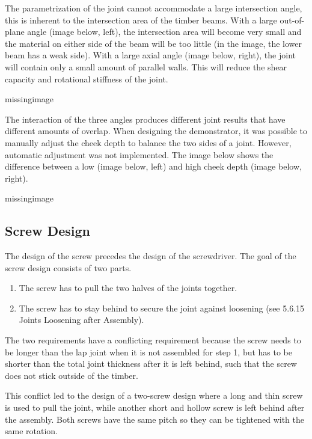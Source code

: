 The parametrization of the joint cannot accommodate a large intersection angle, this is inherent to the intersection area of the timber beams. With a large out-of-plane angle (image below, left), the intersection area will become very small and the material on either side of the beam will be too little (in the image, the lower beam has a weak side). With a large axial angle (image below, right), the joint will contain only a small amount of parallel walls. This will reduce the shear capacity and rotational stiffness of the joint.

missingimage

The interaction of the three angles produces different joint results that have different amounts of overlap. When designing the demonstrator, it was possible to manually adjust the cheek depth to balance the two sides of a joint. However, automatic adjustment was not implemented. The image below shows the difference between a low (image below, left) and high cheek depth (image below, right).

missingimage

\subsection{Screw Design}
\label{subsection:exploration_4_screw_design}

The design of the screw precedes the design of the screwdriver. The goal of the screw design consists of two parts. 

\begin{enumerate}
    \item The screw has to pull the two halves of the joints together.
    \item The screw has to stay behind to secure the joint against loosening (see 5.6.15 Joints Loosening after Assembly).

\end{enumerate}
The two requirements have a conflicting requirement because the screw needs to be longer than the lap joint when it is not assembled for step 1, but has to be shorter than the total joint thickness after it is left behind, such that the screw does not stick outside of the timber. 

This conflict led to the design of a two-screw design where a long and thin screw is used to pull the joint, while another short and hollow screw is left behind after the assembly. Both screws have the same pitch so they can be tightened with the same rotation.

